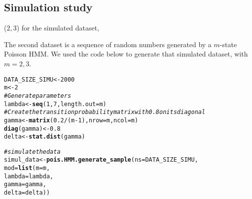 \documentclass[bimj,fleqn]{w-art}\usepackage[]{graphicx}\usepackage[]{color}
\makeatletter
\newcommand{\hlnum}[1]{\textcolor[rgb]{0.686,0.059,0.569}{#1}}%
\newcommand{\hlcom}[1]{\textcolor[rgb]{0.678,0.584,0.686}{\textit{#1}}}%
\newcommand{\hlopt}[1]{\textcolor[rgb]{0,0,0}{#1}}%
\newcommand{\hlstd}[1]{\textcolor[rgb]{0.345,0.345,0.345}{#1}}%
\newcommand{\hlkwb}[1]{\textcolor[rgb]{0.69,0.353,0.396}{#1}}%
\newcommand{\hlkwc}[1]{\textcolor[rgb]{0.333,0.667,0.333}{#1}}%
\newcommand{\hlkwd}[1]{\textcolor[rgb]{0.737,0.353,0.396}{\textbf{#1}}}%
\newenvironment{kframe}{%
 \def\at@end@of@kframe{}%
 \ifinner\ifhmode%
  \def\at@end@of@kframe{\end{minipage}}%
  \begin{minipage}{\columnwidth}%
 \fi\fi%
 \def\FrameCommand##1{\hskip\@totalleftmargin \hskip-\fboxsep
 \colorbox{shadecolor}{##1}\hskip-\fboxsep
     \hskip-\linewidth \hskip-\@totalleftmargin \hskip\columnwidth}%
 \MakeFramed {\advance\hsize-\width
   \@totalleftmargin\z@ \linewidth\hsize
   \@setminipage}}%
 {\par\unskip\endMakeFramed%
 \at@end@of@kframe}
\newenvironment{knitrout}{}{} %
\theoremstyle{plain}
\theoremstyle{definition}
\makeatother
\begin{document}
\subsection{Simulation study}
\label{sec:simu_study}

 ($2, 3$) for the simulated dataset,



The second dataset is a sequence of random numbers generated by a $m$-state Poisson HMM.
We used the code below to generate that simulated dataset, with $m=2, 3$.
\begin{knitrout}
\color{fgcolor}\begin{kframe}
\begin{alltt}
\hlstd{DATA_SIZE_SIMU} \hlkwb{<-} \hlnum{2000}
\hlstd{m} \hlkwb{<-} \hlnum{2}
\hlcom{# Generate parameters}
\hlstd{lambda} \hlkwb{<-} \hlkwd{seq}\hlstd{(}\hlnum{1}\hlstd{,} \hlnum{7}\hlstd{,} \hlkwc{length.out} \hlstd{= m)}
\hlcom{# Create the transition probability matrix with 0.8 on its diagonal}
\hlstd{gamma} \hlkwb{<-} \hlkwd{matrix}\hlstd{(}\hlnum{0.2} \hlopt{/} \hlstd{(m} \hlopt{-} \hlnum{1}\hlstd{),} \hlkwc{nrow} \hlstd{= m,} \hlkwc{ncol} \hlstd{= m)}
\hlkwd{diag}\hlstd{(gamma)} \hlkwb{<-} \hlnum{0.8}
\hlstd{delta} \hlkwb{<-} \hlkwd{stat.dist}\hlstd{(gamma)}

\hlcom{#simulate the data}
\hlstd{simul_data} \hlkwb{<-} \hlkwd{pois.HMM.generate_sample}\hlstd{(}\hlkwc{ns} \hlstd{= DATA_SIZE_SIMU,}
                                       \hlkwc{mod} \hlstd{=} \hlkwd{list}\hlstd{(}\hlkwc{m} \hlstd{= m,}
                                                  \hlkwc{lambda} \hlstd{= lambda,}
                                                  \hlkwc{gamma} \hlstd{= gamma,}
                                                  \hlkwc{delta} \hlstd{= delta))}
\end{alltt}
\end{kframe}
\end{knitrout}
\end{document}
